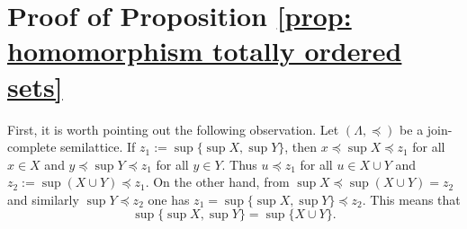 \documentclass[11pt,british,reqno]{article}
\numberwithin{equation}{section}
\numberwithin{figure}{section}
\numberwithin{table}{section}
\theoremstyle{definition}
\theoremstyle{definition}
\theoremstyle{plain}
\theoremstyle{plain}
\theoremstyle{remark}
\theoremstyle{plain}
\numberwithin{equation}{section}
\numberwithin{figure}{section}
\numberwithin{table}{section}
\theoremstyle{plain}
\begin{document}
\section{\label{sec: Appendix B} Proof of Proposition \ref{prop: homomorphism totally ordered sets}}

First, it is worth pointing out the following observation. Let $(\Lambda,\preceq)$ be a join-complete semilattice. If  $z_{1}:=\sup\{\sup X,\sup Y\}$, then $x\preceq\sup X\preceq z_{1}$
for all $x\in X$ and $y\preceq\sup Y\preceq z_{1}$ for all $y\in Y$.
Thus $u\preceq z_{1}$ for all $u\in X\cup Y$ and $z_{2}:=\sup(X\cup Y)\preceq z_{1}$.
On the other hand, from $\sup X\preceq\sup(X\cup Y)=z_{2}$ and similarly
$\sup Y\preceq z_{2}$ one has $z_{1}=\sup\{\sup X,\sup Y\}\preceq z_{2}$.
This means that 
\begin{equation}
\sup\{\sup X,\sup Y\}=\sup\{X\cup Y\}.\label{eq: sup sups =00003D sup join}
\end{equation}  
\end{document}
